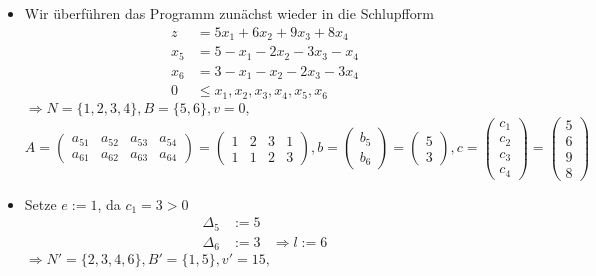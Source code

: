 \documentclass[a4paper,10pt]{article}
\begin{document}
\begin{enumerate}
\begin{itemize}
        \item   Wir überführen das Programm zunächst wieder in die Schlupfform
                \begin{align*}
                    z   &=     5x_1 + 6x_2 + 9x_3 + 8x_4 \\
                    x_5 &= 5 -  x_1 - 2x_2 - 3x_3 -  x_4 \\
                    x_6 &= 3 -  x_1 -  x_2 - 2x_3 - 3x_4 \\
                      0 &\leq x_1, x_2, x_3, x_4, x_5, x_6 
                \end{align*}
                $\Rightarrow N = \{1,2,3,4\}, B = \{5,6\}, v = 0,$
                \[
                 A = \begin{pmatrix}
                        a_{51} & a_{52} & a_{53} & a_{54}\\
                        a_{61} & a_{62} & a_{63} & a_{64}
                     \end{pmatrix}
                   = \begin{pmatrix}
                        1 & 2 & 3 & 1 \\
                        1 & 1 & 2 & 3
                     \end{pmatrix}, 
                 b = \begin{pmatrix}b_5 \\ b_6 \end{pmatrix} 
                   = \begin{pmatrix}5 \\ 3 \end{pmatrix},
                 c = \begin{pmatrix}c_1 \\ c_2 \\ c_3 \\ c_4\end{pmatrix} 
                   = \begin{pmatrix}5 \\ 6 \\ 9 \\ 8 \end{pmatrix}
                \]
        \item   Setze $e := 1$, da $c_1 = 3 > 0$
                \begin{align*}
                    \Delta_5 &:= 5\\
                    \Delta_6 &:= 3 & \Rightarrow l := 6
                \end{align*}
                $\Rightarrow N' = \{2,3,4,6\}, B' = \{1,5\}, v' = 15,$

\end{itemize}
\end{enumerate}
\end{document}
